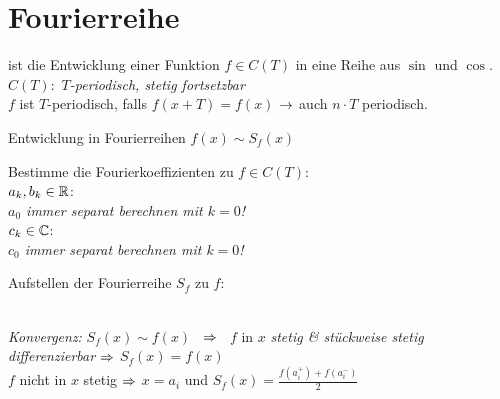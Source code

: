 \documentclass[german,color]{latex4ei/latex4ei_fs}
\begin{document}
\section{Fourierreihe}
\begin{sectionbox}
ist die Entwicklung einer Funktion $f\in C(T)$ in eine Reihe aus $\sin$ und $\cos$.\\
$C(T):$ \emph{$T$-periodisch, stetig fortsetzbar}\\
$f$ ist $T$-periodisch, falls $f(x+T) = f(x)$ $\rightarrow$ auch $n \cdot T$ periodisch.

	\begin{cookbox}{Entwicklung in Fourierreihen $f(x) \sim S_f(x)$}
		\item Bestimme die Fourierkoeffizienten zu $f \in C(T)$:\\
		$a_k,b_k \in \operatorname{\mathbb R}$: \quad {}\\
		\emph{$a_0$ immer separat berechnen mit $k = 0$!}\\
		$c_k \in \mathbb C$: \quad {} \\
		\emph{$c_0$ immer separat berechnen mit $k = 0$!}\\
		
		\item Aufstellen der Fourierreihe $S_f$ zu $f$:  \\
		 \\
	\end{cookbox}
	
	\emph{Konvergenz:} $S_f(x) \sim f(x)$ \ $\Rightarrow$ \ $f$ in $x$ \emph{stetig \& stückweise stetig differenzierbar} $\Rightarrow$ $S_f(x) = f(x)$\\
	$f$ nicht in $x$ stetig $\Rightarrow$ $x = a_i$ und $S_f(x) = \frac{f(a_i^+) + f(a_i^-)}{2}$\\
\end{sectionbox}
\end{document}
